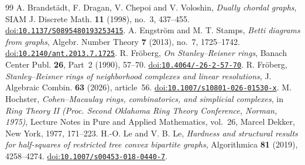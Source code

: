 \documentclass[10pt,a4paper]{amsart}
\numberwithin{equation}{section}
\begin{document}
\begin{thebibliography}{99}
 A. Brandst\"adt, F. Dragan, V. Chepoi and V. Voloshin, \emph{Dually chordal graphs}, SIAM J. Discrete Math. \textbf{11} (1998), no.~3, 437--455. \href{https://doi.org/10.1137/S0895480193253415}{doi:\nolinkurl{10.1137/S0895480193253415}}.
 A. Engstr\"om and M. T. Stamps, \emph{Betti diagrams from graphs}, Algebr. Number Theory \textbf{7} (2013), no.~7, 1725--1742. \href{https://doi.org/10.2140/ant.2013.7.1725}{doi:\nolinkurl{10.2140/ant.2013.7.1725}}.
 R. Fr\"oberg, \emph{On Stanley--Reisner rings}, Banach Center Publ. \textbf{26}, Part~2 (1990), 57--70. \href{https://doi.org/10.4064/-26-2-57-70}{doi:\nolinkurl{10.4064/-26-2-57-70}}.
 R. Fr\"oberg, \emph{Stanley--Reisner rings of neighborhood complexes and linear resolutions}, J. Algebraic Combin. \textbf{63} (2026), article~56. \href{https://doi.org/10.1007/s10801-026-01530-x}{doi:\nolinkurl{10.1007/s10801-026-01530-x}}.
 M. Hochster, \emph{Cohen--Macaulay rings, combinatorics, and simplicial complexes}, in \emph{Ring Theory II (Proc. Second Oklahoma Ring Theory Conference, Norman, 1975)}, Lecture Notes in Pure and Applied Mathematics, vol.~26, Marcel Dekker, New York, 1977, 171--223.
 H.-O. Le and V. B. Le, \emph{Hardness and structural results for half-squares of restricted tree convex bipartite graphs}, Algorithmica \textbf{81} (2019), 4258--4274. \href{https://doi.org/10.1007/s00453-018-0440-7}{doi:\nolinkurl{10.1007/s00453-018-0440-7}}.
\end{thebibliography}
\end{document}
